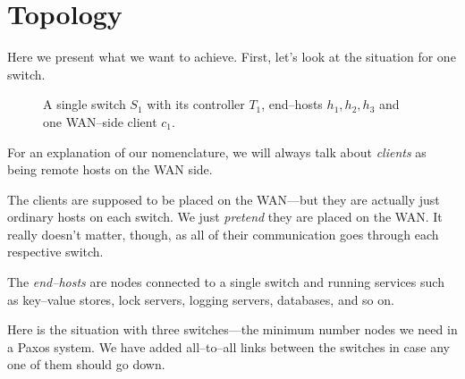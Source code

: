 \section{Topology}

Here we present what we want to achieve.  First, let's look at the situation
for one switch.

\begin{figure}[H]
  \centering
  \caption{A single switch $S_1$ with its controller $T_1$, end--hosts
    $h_1, h_2, h_3$ and one WAN--side client $c_1$.}
  \label{figure:graph.single.switch}
\end{figure}

For an explanation of our nomenclature, we will always talk about
\textit{clients} as being remote hosts on the \ac{WAN} side.

The clients are supposed to be placed on the \ac{WAN}---but they are actually
just ordinary hosts on each switch.  We just \textit{pretend} they are
placed on the WAN.  It really doesn't matter, though, as all of their
communication goes through each respective switch.

The \textit{end--hosts} are nodes connected to a single switch and running
services such as key--value stores, lock servers, logging servers,
databases, and so on.

Here is the situation with three switches---the minimum number nodes we need
in a Paxos system.  We have added all--to--all links between the switches in
case any one of them should go down.

